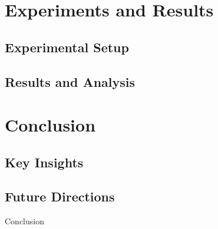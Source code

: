 \documentclass[aspectratio=169,xcolor=dvipsnames]{beamer}
\begin{document}


\section{Experiments and Results}

\subsection{Experimental Setup}

\subsection{Results and Analysis}


\section{Conclusion}

\subsection{Key Insights}

\subsection{Future Directions}

\begin{frame}{Conclusion}

\end{frame}
\end{document}
